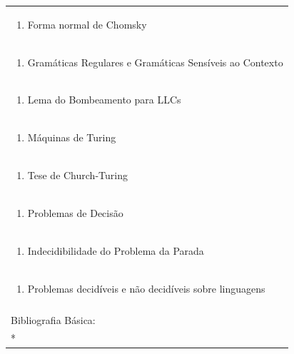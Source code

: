 \documentclass[11pt]{article}
\begin{document}
\begin{center}
\begin{longtable}{|p{4cm}|p{4cm}|p{4cm}|p{4cm}|}
\multicolumn{4}{|p{\dimexpr 16cm + 6\tabcolsep\relax}|}{\begin{enumerate}[start=11]\item Forma normal de Chomsky\end{enumerate}}\\
\multicolumn{4}{|p{\dimexpr 16cm + 6\tabcolsep\relax}|}{\begin{enumerate}[start=12]\item Gramáticas Regulares e Gramáticas Sensíveis ao Contexto\end{enumerate}}\\
\multicolumn{4}{|p{\dimexpr 16cm + 6\tabcolsep\relax}|}{\begin{enumerate}[start=13]\item Lema do Bombeamento para LLCs\end{enumerate}}\\
\multicolumn{4}{|p{\dimexpr 16cm + 6\tabcolsep\relax}|}{\begin{enumerate}[start=14]\item Máquinas de Turing\end{enumerate}}\\
\multicolumn{4}{|p{\dimexpr 16cm + 6\tabcolsep\relax}|}{\begin{enumerate}[start=15]\item Tese de Church-Turing\end{enumerate}}\\
\multicolumn{4}{|p{\dimexpr 16cm + 6\tabcolsep\relax}|}{\begin{enumerate}[start=16]\item Problemas de Decisão\end{enumerate}}\\
\multicolumn{4}{|p{\dimexpr 16cm + 6\tabcolsep\relax}|}{\begin{enumerate}[start=17]\item Indecidibilidade do Problema da Parada\end{enumerate}}\\
\multicolumn{4}{|p{\dimexpr 16cm + 6\tabcolsep\relax}|}{\begin{enumerate}[start=18]\item Problemas decidíveis e não decidíveis sobre linguagens\end{enumerate}}\\
\multicolumn{4}{|p{\dimexpr 16cm + 6\tabcolsep\relax}|}{}\\
\hline
\multicolumn{4}{|p{16cm}|}{Bibliografia Básica:}\\*

\end{longtable}
\end{center}
\end{document}
